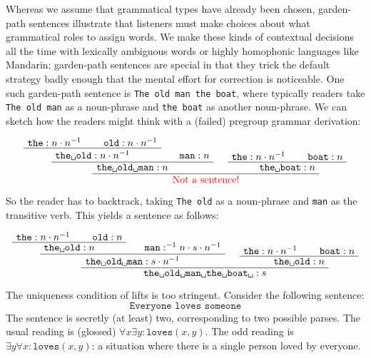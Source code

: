 \begin{example}
Whereas we assume that grammatical types have already been chosen, garden-path sentences illustrate that listeners must make choices about what grammatical roles to assign words. We make these kinds of contextual decisions all the time with lexically ambiguous words or highly homophonic languages like Mandarin; garden-path sentences are special in that they trick the default strategy badly enough that the mental effort for correction is noticeable. One such garden-path sentence is \texttt{The old man the boat}, where typically readers take \texttt{The old man} as a noun-phrase and \texttt{the boat} as another noun-phrase. We can sketch how the readers might think with a (failed) pregroup grammar derivation:

\[
\AxiomC{$\texttt{the} : n \cdot n^{-1}$}
\AxiomC{$\texttt{old} : n \cdot n^{-1}$}
\BinaryInfC{$\texttt{the\textvisiblespace old}: n \cdot n^{-1}$}
\AxiomC{$\texttt{man} : n$}
\BinaryInfC{$\texttt{the\textvisiblespace old\textvisiblespace man}: n$}
\AxiomC{$\texttt{the} : n \cdot n^{-1}$}
\AxiomC{$\texttt{boat} : n$}
\BinaryInfC{$\texttt{the\textvisiblespace boat}: n$}
\BinaryInfC{\textcolor{red}{Not a sentence!}}
\DisplayProof
\]

So the reader has to backtrack, taking \texttt{The old} as a noun-phrase and \texttt{man} as the transitive verb. This yields a sentence as follows:

\[
\AxiomC{$\texttt{the} : n \cdot n^{-1}$}
\AxiomC{$\texttt{old} : n$}
\BinaryInfC{$\texttt{the\textvisiblespace old}: n$}
\AxiomC{$\texttt{man} : ^{-1}n \cdot s \cdot n^{-1}$}
\BinaryInfC{$\texttt{the\textvisiblespace old\textvisiblespace man}: s \cdot n^{-1}$}
\AxiomC{$\texttt{the} : n \cdot n^{-1}$}
\AxiomC{$\texttt{boat} : n$}
\BinaryInfC{$\texttt{the\textvisiblespace old}: n$}
\BinaryInfC{$\texttt{the\textvisiblespace old\textvisiblespace man\textvisiblespace the\textvisiblespace boat\textvisiblespace}: s$}
\DisplayProof
\]
\end{example}

\begin{example}
The uniqueness condition of lifts is too stringent. Consider the following sentence:
\[\texttt{Everyone loves someone}\]
The sentence is secretly (at least) two, corresponding to two possible parses. The usual reading is (glossed) $\forall x \exists y : \texttt{loves}(x,y)$. The odd reading is $\exists y \forall x : \texttt{loves}(x,y)$: a situation where there is a single person loved by everyone.
\end{example}

